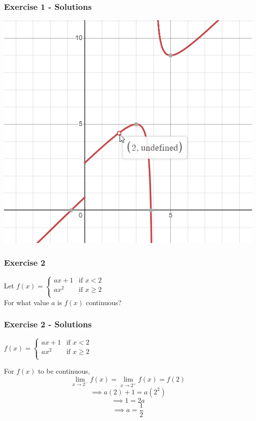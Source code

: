 \documentclass[12pt]{beamer}
\begin{document}
\begin{frame}
	\frametitle{Exercise 1 - Solutions}

	\begin{center}
		\includegraphics[scale=0.6]{exercise_1_solution_graph.png}
	\end{center}
\end{frame}
\begin{frame}
	\frametitle{Exercise 2}
	\Large
	\begin{center}
		Let $f(x) =
			\begin{cases}
				ax + 1 & \text{if } x < 2    \\
				ax^2   & \text{if } x \geq 2 \\
			\end{cases}
		$\\
		\vspace*{\fill}
		For what value $a$ is $f(x)$ continuous?
	\end{center}
\end{frame}
\begin{frame}
	\frametitle{Exercise 2 - Solutions}

	\large
	\begin{center}
		$f(x) =
			\begin{cases}
				ax + 1 & \text{if } x < 2    \\
				ax^2   & \text{if } x \geq 2 \\
			\end{cases}
		$\\
		\vspace*{\fill}
	\end{center}
	For $f(x)$ to be continuous,
	\[\displaystyle\lim_{x\to2^{-}}f(x)=\displaystyle\lim_{x\to2^{+}}f(x)=f(2)\]
	\[\implies a(2)+1 = a(2^2)\]
	\[\implies 1 = 2a\]
	\[\implies \boxed{a = \frac{1}{2}}\]
\end{frame}
\end{document}
